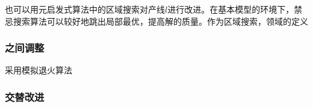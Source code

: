 也可以用元启发式算法中的区域搜索对产线$l$进行改进。在基本模型的环境下，禁忌搜索算法可以较好地跳出局部最优，提高解的质量。作为区域搜索，领域的定义
\subsubsection{之间调整}
采用模拟退火算法
\subsubsection{交替改进}
